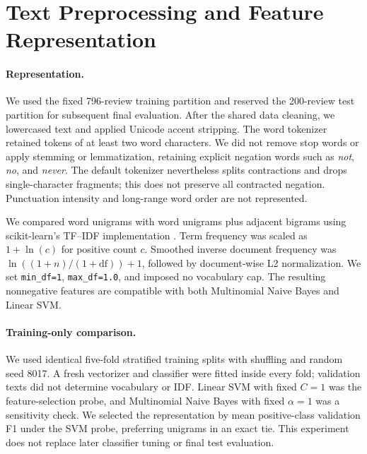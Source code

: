 \section{Text Preprocessing and Feature Representation}
\label{sec:text-features}

\paragraph{Representation.}
We used the fixed 796-review training partition and reserved the
200-review test partition for subsequent final evaluation.
After the shared data cleaning, we lowercased text and applied Unicode
accent stripping. The word tokenizer retained tokens of at least two
word characters. We did not remove stop words or apply stemming or
lemmatization, retaining explicit negation words such as \emph{not},
\emph{no}, and \emph{never}. The default tokenizer nevertheless splits
contractions and drops single-character fragments; this does not
preserve all contracted negation. Punctuation intensity and long-range
word order are not represented.

We compared word unigrams with word unigrams plus adjacent bigrams using
scikit-learn's TF--IDF implementation \citep{pedregosa2011scikit,manning2008ir}.
Term frequency was scaled as $1+\ln(c)$ for positive count $c$.
Smoothed inverse document frequency was
$\ln((1+n)/(1+\mathrm{df}))+1$, followed by document-wise L2 normalization.
We set \texttt{min\_df=1}, \texttt{max\_df=1.0}, and imposed no vocabulary
cap. The resulting nonnegative features are compatible with both
Multinomial Naive Bayes and Linear SVM.

\paragraph{Training-only comparison.}
We used identical five-fold stratified training splits with shuffling
and random seed 8017. A fresh vectorizer and classifier were fitted
inside every fold; validation texts did not determine vocabulary or IDF.
Linear SVM with fixed $C=1$ was the feature-selection probe, and
Multinomial Naive Bayes with fixed $\alpha=1$ was a sensitivity check.
We selected the representation by mean positive-class validation F1
under the SVM probe, preferring unigrams in an exact tie. This experiment
does not replace later classifier tuning or final test evaluation.

